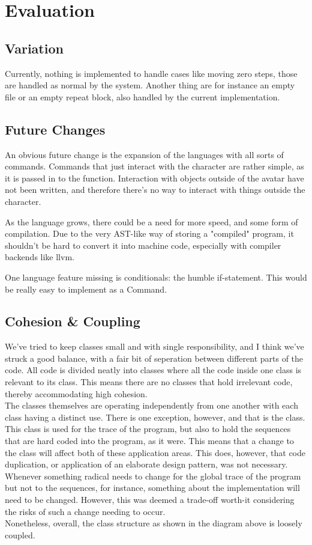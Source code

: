 \chapter{Evaluation}

\section{Variation}
Currently, nothing is implemented to handle cases like moving zero steps, those are handled as normal by the system. Another thing are for instance an empty file or an empty repeat block, also handled
by the current implementation.

\section{Future Changes}
An obvious future change is the expansion of the languages with all sorts of commands. Commands that just interact with the character are rather simple, as it is passed in to the function. Interaction
with objects outside of the avatar have not been written, and therefore there's no way to interact with things outside the character. 

As the language grows, there could be a need for more speed, and some form of compilation. Due to the very AST-like way of storing a "compiled" program, it shouldn't be hard to convert it into machine
code, especially with compiler backends like llvm.

One language feature missing is conditionals: the humble if-statement. This would be really easy to implement as a Command.

\section{Cohesion \& Coupling}
We've tried to keep classes small and with single responsibility, and I think we've struck a good balance, with a fair bit of seperation between different parts of the code.
All code is divided neatly into classes where all the code inside one class is relevant to its class. This means there are no classes that hold irrelevant code, thereby accommodating high cohesion. \\
The classes themselves are operating independently from one another with each class having a distinct use. There is one exception, however, and that is the  class. This class is used for the trace of the program, but also to hold the sequences that are hard coded into the program, as it were. This means that a change to the  class will affect both of these application areas. This does, however, that code duplication, or application of an elaborate design pattern, was not necessary. Whenever something radical needs to change for the global trace of the program but not to the sequences, for instance, something about the implementation will need to be changed. However, this was deemed a trade-off worth-it considering the risks of such a change needing to occur. \\
Nonetheless, overall, the class structure as shown in the diagram above is loosely coupled. 
